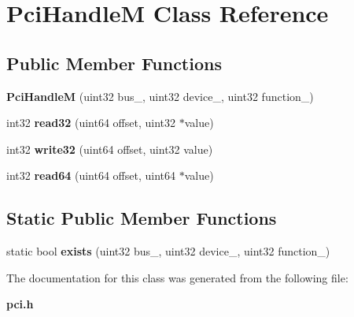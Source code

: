 \section{Pci\+HandleM Class Reference}
\label{classPciHandleM}
\subsection*{Public Member Functions}
\begin{DoxyCompactItemize}
\item 
{\bfseries Pci\+HandleM} (uint32 bus\+\_\+, uint32 device\+\_\+, uint32 function\+\_\+)\label{classPciHandleM_ad067fc750d7b2f05b9e67badbdf237d3}

\item 
int32 {\bfseries read32} (uint64 offset, uint32 $\ast$value)\label{classPciHandleM_ac9257ce7ae864201459f4db8996de7f6}

\item 
int32 {\bfseries write32} (uint64 offset, uint32 value)\label{classPciHandleM_a412df968cfe50c405aa445c2b52bf6b1}

\item 
int32 {\bfseries read64} (uint64 offset, uint64 $\ast$value)\label{classPciHandleM_a8fced207ab30a888b09ce361d1a45980}

\end{DoxyCompactItemize}
\subsection*{Static Public Member Functions}
\begin{DoxyCompactItemize}
\item 
static bool {\bfseries exists} (uint32 bus\+\_\+, uint32 device\+\_\+, uint32 function\+\_\+)\label{classPciHandleM_a195a5313b1c82370aa5d4f981266498e}

\end{DoxyCompactItemize}


The documentation for this class was generated from the following file\+:\begin{DoxyCompactItemize}
\item 
{\bf pci.\+h}\end{DoxyCompactItemize}
